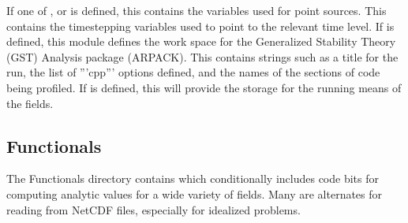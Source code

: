 \begin{klist}
   If one of , 
    or  is defined, this contains the variables used
    for point sources.
   This contains the timestepping variables used to
    point to the relevant time level.
   If  is
    defined, this module defines the work space for the Generalized
    Stability Theory (GST) Analysis package (ARPACK).
   This contains strings such as a title for the run,
    the list of '''cpp''' options defined, and the names of the sections of
    code being profiled.
    If  is defined, this will
    provide the storage for the running means of the fields.
\end{klist}

\subsection{Functionals}
\label{Functionals}
The Functionals directory contains  which
conditionally includes code bits for computing analytic values for a
wide variety of fields. Many are alternates for reading from NetCDF
files, especially for idealized problems.
